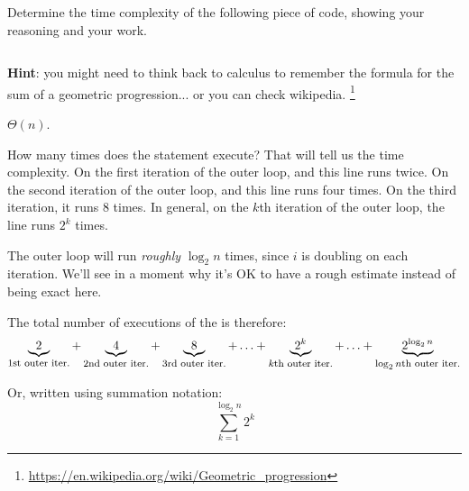 \begin{prob}
    Determine the time complexity of the following piece of code, showing your reasoning
    and your work.

    \inputminted{python}{\thisdir/include/code.py}

    \textbf{Hint}: you might need to think back to calculus to remember the formula for
    the sum of a geometric progression... or you can check wikipedia.%
    \footnote{\url{https://en.wikipedia.org/wiki/Geometric_progression}}

    \begin{soln}
        $\Theta(n)$.

        How many times does the  statement execute? That will tell us the time complexity.
        On the first iteration
        of the outer loop,  and this line runs twice. On the second iteration
        of the outer loop,  and this line runs four times. On the third
        iteration, it runs 8 times. In general, on the $k$th iteration of the outer loop,
        the line runs $2^k$ times.

        The outer loop will run \emph{roughly} $\log_2 n$ times, since $i$ is doubling on
        each iteration. We'll see in a moment why it's OK to have a rough
        estimate instead of being exact here.

        The total number of executions of the  is therefore:
        \[
            \underbrace{2}_{\text{\footnotesize 1st outer iter.}}
            +
            \underbrace{4}_{\text{\footnotesize 2nd outer iter.}}
            +
            \underbrace{8}_{\text{\footnotesize 3rd outer iter.}}
            +
            \ldots
            +
            \underbrace{2^k}_{\text{\footnotesize $k$th outer iter.}}
            +
            \ldots
            +
            \underbrace{2^{\log_2 n}}_{\text{\footnotesize $\log_2 n$th outer iter.}}
        \]

        Or, written using summation notation:
        \[
            \sum_{k=1}^{\log_2 n} 2^k
        \]


\end{soln}
\end{prob}

